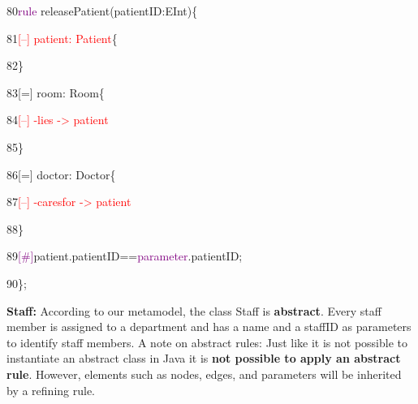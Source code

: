 {

80\hspace{0.5cm}\textcolor{Purple}{rule} releasePatient(patientID:EInt)\{

81\hspace{1cm}\textcolor{red}{[--]  patient: Patient}\{

82\hspace{1cm}\}

83\hspace{1cm}[=] room: Room\{

84\hspace{1.5cm}\textcolor{red}{[--] -lies -> patient}

85\hspace{1cm}\}

86\hspace{1cm}[=] doctor: Doctor\{

87\hspace{1.5cm}\textcolor{red}{[--] -caresfor -> patient}

88\hspace{1cm}\}

89\hspace{1cm}\textcolor{Purple}{[\#]}patient.patientID==\textcolor{Purple}{parameter}.patientID;

90\hspace{0.5cm}\};\newline\newline

}

\clearpage

\textbf{Staff:}\newline
According to our metamodel, the class Staff is \textbf{abstract}. Every staff member is assigned to a department and has a name and a staffID as parameters to identify staff members. \newline
A note on abstract rules: Just like it is not possible to instantiate an abstract class in Java it is \textbf{not possible to apply an abstract rule}. However, elements such as nodes, edges, and parameters will be inherited by a refining rule.\newline\newline


